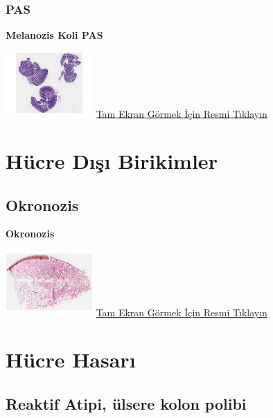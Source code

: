 \documentclass[
  letterpaper,
  DIV=11,
  numbers=noendperiod]{scrreprt}
\begin{document}
\hypertarget{pas-2}{%
\subsection{PAS}\label{pas-2}}

\textbf{Melanozis Koli PAS}

\href{https://images.patolojiatlasi.com/melanosiscoli/PAS.html}{\includegraphics[width=0.25\textwidth,height=\textheight]{./screenshots/thumbnail_melanosiscoli-PAS.png}}
\href{https://images.patolojiatlasi.com/melanosiscoli/PAS.html}{Tam
Ekran Görmek İçin Resmi Tıklayın}

\hypertarget{sec-hucre-disi-birikimler}{%
\chapter{Hücre Dışı Birikimler}\label{sec-hucre-disi-birikimler}}

\hypertarget{sec-okronozis}{%
\section{Okronozis}\label{sec-okronozis}}

\textbf{Okronozis}

\href{https://images.patolojiatlasi.com/ochronosis/HE.html}{\includegraphics[width=0.25\textwidth,height=\textheight]{./screenshots/thumbnail_ochronosis.png}}
\href{https://images.patolojiatlasi.com/ochronosis/HE.html}{Tam Ekran
Görmek İçin Resmi Tıklayın}

\hypertarget{sec-hucre-hasari}{%
\chapter{Hücre Hasarı}\label{sec-hucre-hasari}}

\hypertarget{sec-reaktif-atipi}{%
\section{Reaktif Atipi, ülsere kolon polibi}\label{sec-reaktif-atipi}}
\end{document}
